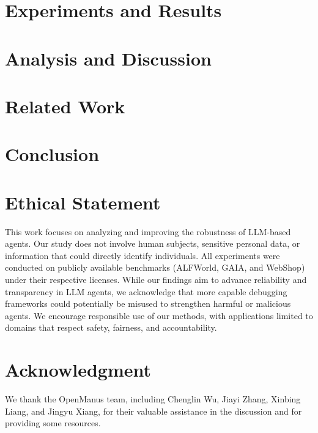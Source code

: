 \documentclass{article} %
\begin{document}
\section{Experiments and Results}
\label{sec:experiment}


\section{Analysis and Discussion}
\label{sec:discussion}


\section{Related Work}
\label{sec:related_works}


\section{Conclusion}
\label{sec:conclusion}


\section*{Ethical Statement}
This work focuses on analyzing and improving the robustness of LLM-based agents. Our study does not involve human subjects, sensitive personal data, or information that could directly identify individuals. All experiments were conducted on publicly available benchmarks (ALFWorld, GAIA, and WebShop) under their respective licenses. While our findings aim to advance reliability and transparency in LLM agents, we acknowledge that more capable debugging frameworks could potentially be misused to strengthen harmful or malicious agents. We encourage responsible use of our methods, with applications limited to domains that respect safety, fairness, and accountability.

\section*{Acknowledgment}
We thank the OpenManus team, including Chenglin Wu, Jiayi Zhang, Xinbing Liang, and Jingyu Xiang, for their valuable assistance in the discussion and for providing some resources.


\end{document}
